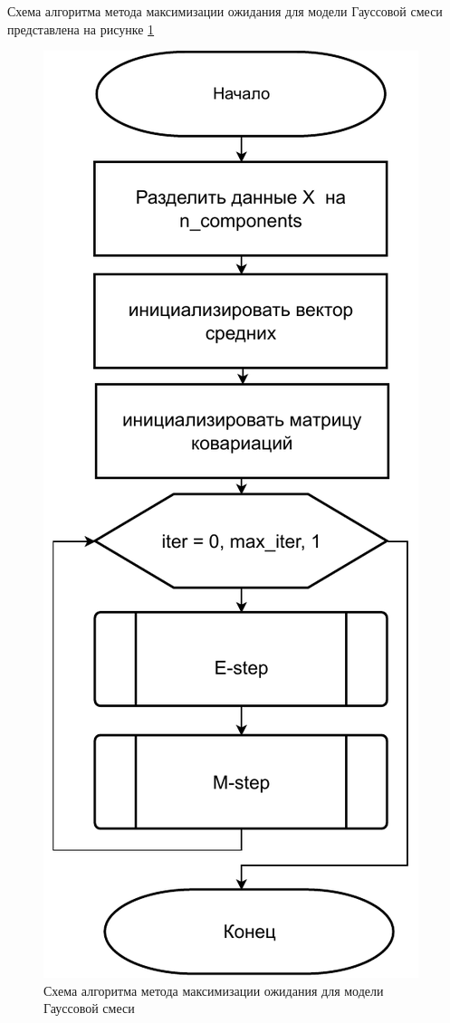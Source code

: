 Схема алгоритма метода максимизации ожидания для модели Гауссовой смеси представлена на рисунке \ref{EM}

\begin{figure}[H]
	\centering
	\includegraphics[scale=1]{img/EM.pdf}
	\caption{Схема алгоритма метода максимизации ожидания для модели Гауссовой смеси}
	\label{EM}
\end{figure}

